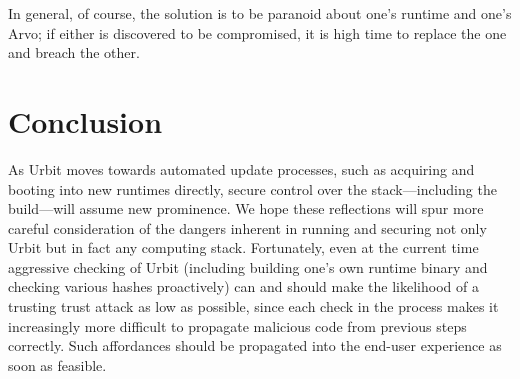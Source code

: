 \documentclass[twoside]{article}
\begin{document}
In general, of course, the solution is to be paranoid about one's runtime and one's Arvo; if either is discovered to be compromised, it is high time to replace the one and breach the other.

\section{Conclusion}

As Urbit moves towards automated update processes, such as acquiring and booting into new runtimes directly, secure control over the stack—including the build—will assume new prominence.  We hope these reflections will spur more careful consideration of the dangers inherent in running and securing not only Urbit but in fact any computing stack.  Fortunately, even at the current time aggressive checking of Urbit (including building one's own runtime binary and checking various hashes proactively) can and should make the likelihood of a trusting trust attack as low as possible, since each check in the process makes it increasingly more difficult to propagate malicious code from previous steps correctly.  Such affordances should be propagated into the end-user experience as soon as feasible.\tombstone{}

\printbibliography
\afterpage{\blankpage}
\end{document}
